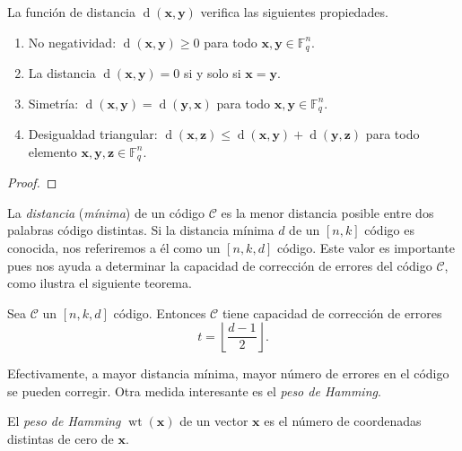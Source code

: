 \begin{theorem}
  La función de distancia \(\operatorname{d}(\mathbf{x}, \mathbf{y})\) verifica las siguientes propiedades.
  \begin{enumerate}
    \item No negatividad: \(\operatorname{d}(\mathbf{x}, \mathbf{y}) \geq 0\) para todo \(\mathbf{x}, \mathbf{y}\in \mathbb F_q^n\).
    \item La distancia \(\operatorname{d}(\mathbf{x}, \mathbf{y}) = 0\) si y solo si \(\mathbf{x} = \mathbf{y}\).
    \item Simetría: \(\operatorname{d}(\mathbf{x}, \mathbf{y}) = \operatorname{d}(\mathbf{y}, \mathbf{x})\) para todo \(\mathbf{x}, \mathbf{y}\in \mathbb F_q^n\).
    \item Desigualdad triangular: \(\operatorname{d}(\mathbf{x}, \mathbf{z}) \leq \operatorname{d}(\mathbf{x}, \mathbf{y}) + \operatorname{d}(\mathbf{y}, \mathbf{z})\) para todo elemento \(\mathbf{x}, \mathbf{y}, \mathbf{z}\in \mathbb F_q^n\).
  \end{enumerate}
\end{theorem}

\begin{proof}
  
\end{proof}

La \textit{distancia} (\textit{mínima}) de un código \(\mathcal C\) es la menor distancia posible entre dos palabras código distintas. 
Si la distancia mínima \(d\) de un \([n,k]\) código es conocida, nos referiremos a él como un \([n,k,d]\) código.
Este valor es importante pues nos ayuda a determinar la capacidad de corrección de errores del código \(\mathcal C\), como ilustra el siguiente teorema.

\begin{theorem}
  Sea \(\mathcal C\) un \([n, k, d]\) código. Entonces \(\mathcal C\) tiene capacidad de corrección de errores \[
    t = \left\lfloor \frac{d - 1}{2} \right\rfloor.
  \]
\end{theorem}


Efectivamente, a mayor distancia mínima, mayor número de errores en el código se pueden corregir.
Otra medida interesante es el \textit{peso de Hamming}.

\begin{definition}
  El \textit{peso de Hamming} \(\operatorname{wt}(\mathbf{x})\) de un vector \(\mathbf{x}\) es el número de coordenadas distintas de cero de \(\mathbf{x}\).
\end{definition}

